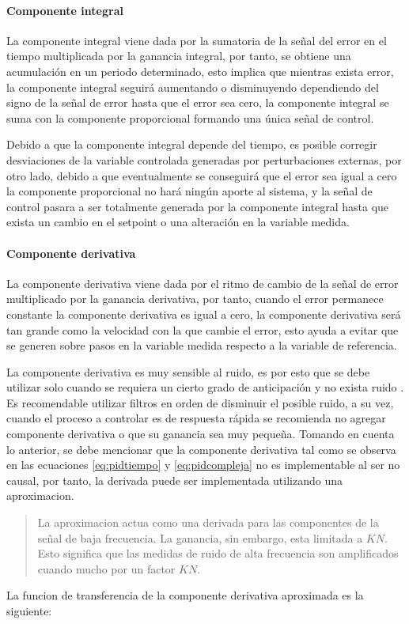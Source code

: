 			\paragraph{Componente integral}

				La componente integral viene dada por la sumatoria de la señal del error en el tiempo multiplicada por la ganancia integral, por tanto, se obtiene una acumulación en un periodo determinado, esto implica que mientras exista error, la componente integral seguirá aumentando o disminuyendo dependiendo del signo de la señal de error hasta que el error sea cero, la componente integral se suma con la componente proporcional formando una única señal de control.

				Debido a que la componente integral depende del tiempo, es posible corregir desviaciones de la variable controlada generadas por perturbaciones externas, por otro lado, debido a que eventualmente se conseguirá que el error sea igual a cero la componente proporcional no hará ningún aporte al sistema, y la señal de control pasara a ser totalmente generada por la componente integral hasta que exista un cambio en el setpoint o una alteración en la variable medida.

			\paragraph{Componente derivativa}

				La componente derivativa viene dada por el ritmo de cambio de la señal de error multiplicado por la ganancia derivativa, por tanto, cuando el error permanece constante la componente derivativa es igual a cero, la componente derivativa será tan grande como la velocidad con la que cambie el error, esto ayuda a evitar que se generen sobre pasos en la variable medida respecto a la variable de referencia.
				
				La componente derivativa es muy sensible al ruido, es por esto que se debe utilizar solo cuando se requiera un cierto grado de anticipación y no exista ruido \Parencite{smith1985principles}. Es recomendable utilizar filtros en orden de disminuir el posible ruido, a su vez, cuando el proceso a controlar es de respuesta rápida se recomienda no agregar componente derivativa o que su ganancia sea muy pequeña. Tomando en cuenta lo anterior, se debe mencionar que la componente derivativa tal como se observa en las ecuaciones \cref{eq:pidtiempo} y \cref{eq:pidcompleja} no es implementable al ser no causal, por tanto, la derivada puede ser implementada utilizando una aproximacion. \blockquote[{\cite[p.220]{aastrom2002control}}]{La aproximacion actua como una derivada para las componentes de la señal de baja frecuencia. La ganancia, sin embargo, esta limitada a $KN$. Esto significa que las medidas de ruido de alta frecuencia son amplificados cuando mucho por un factor $KN$.} La funcion de transferencia de la componente derivativa aproximada es la siguiente:

